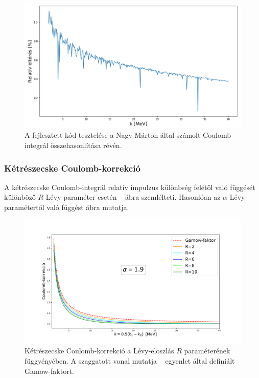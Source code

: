 \documentclass[11pt,a4paper]{article}
\numberwithin{equation}{subsection}
\numberwithin{figure}{section}
\begin{document}
\begin{figure}[H]
\centering
\includegraphics[scale=0.6]{pic/Coulomb/mynm}
\caption{A fejlesztett kód tesztelése a Nagy Márton által számolt Coulomb-integrál összehasonlítása révén.}
\label{fig:nmc}
\end{figure}

\subsubsection{Kétrészecske Coulomb-korrekció}

A kétrészecske Coulomb-integrál relatív impulzus különbség felétől való függését különböző $R$ Lévy-paraméter esetén ~ ábra szemlélteti. Hasonlóan az $\alpha$ Lévy-paramétertől való függést  ábra mutatja.

\begin{figure}[H]
\centering
\includegraphics[scale=0.45]{pic/Coulomb/C2_dR_a19_S2correct.pdf}
\caption{Kétrészecske Coulomb-korrekció a Lévy-eloszlás $R$ paraméterének függvényében. A szaggatott vonal mutatja ~ egyenlet által definiált Gamow-faktort.}
\label{fig:CRK2dR}
\end{figure}
\end{document}
